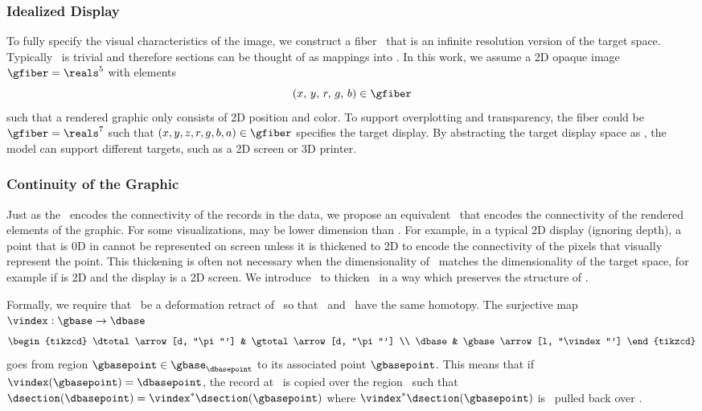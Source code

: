 \documentclass[../main.tex]{subfiles}
\begin{document}
\subsubsection{Idealized Display \gfiber}
\label{sec:graphic_fiber}
To fully specify the visual characteristics of the image, we construct a fiber \gfiber\ that is an infinite resolution version of the target space. Typically \gtotal\ is trivial and therefore sections can be thought of as mappings into \gfiber. In this work, we assume a 2D opaque image $\gfiber=\reals^5$ with elements 
\begin{equation}
(x,\, y,\, r,\, g,\, b) \in \gfiber
\end{equation}
such that a rendered graphic only consists of 2D position and color. To support overplotting and transparency, the fiber could be $\gfiber=\reals^{7}$ such that $(x, y, z, r, g, b, a) \in \gfiber$ specifies the target display. By abstracting the target display space as \gfiber, the model can support different targets, such as a 2D screen or 3D printer. 

\subsubsection{Continuity of the Graphic \gbase} 
\label{sec:graphic_base}
Just as the \dbase\ encodes the connectivity of the records in the data, we propose an equivalent \gbase\ that encodes the connectivity of the rendered elements of the graphic. For some visualizations, \dbase may be lower dimension than \gbase. For example, in a typical 2D display (ignoring depth), a point that is 0D in \dbase cannot be represented on screen unless it is thickened to 2D to encode the connectivity of the pixels that visually represent the point. This thickening is often not necessary when the dimensionality of \dbase\ matches the dimensionality of the target space, for example if \dbase is 2D and the display is a 2D screen. We introduce \gbase\ to thicken \dbase\ in a way which preserves the structure of \dbase. 

Formally, we require that \dbase\ be a deformation retract\cite{RetractionTopology2020} of \gbase\ so that \dbase\ and \gbase\ have the same homotopy. The surjective map $\vindex: \gbase \rightarrow \dbase$ 
\begin{equation}
    \begin{tikzcd}
        \dtotal \arrow[d, "\pi"'] & \gtotal \arrow[d, "\pi"'] \\
        \dbase                   & \gbase \arrow[l, "\vindex"']
    \end{tikzcd}
\end{equation}
goes from region $\gbasepoint \in \gbase_{\dbasepoint}$ to its associated point $\gbasepoint$. This means that if $\vindex(\gbasepoint) = \dbasepoint$, the record at \dbasepoint\ is copied over the region \gbasepoint\ such that $\dsection(\dbasepoint)=\vindex^*\dsection(\gbasepoint)$ where $\vindex^*\dsection(\gbasepoint)$  is \dsection\ pulled back over \gbase. 
\end{document}
